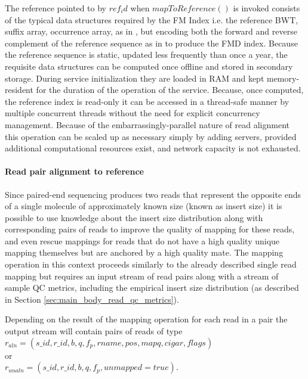 The reference pointed to by $ref_id$ when $mapToReference()$ is invoked consists of the typical data structures required by the FM Index i.e. the reference BWT, suffix array, occurrence array, as in \autocite{ferragina2000opportunistic}, but encoding both the forward and reverse complement of the reference sequence as in \autocite{Li2013} to produce the FMD index. Because the reference sequence is static, updated less frequently than once a year, the requisite data structures can be computed once offline and stored in secondary storage. During service initialization they are loaded in RAM and kept memory-resident for the duration of the operation of the service. Because, once computed, the reference index is read-only it can be accessed in a thread-safe manner by multiple concurrent threads without the need for explicit concurrency management. Because of the embarrassingly-parallel nature of read alignment this operation can be scaled up as necessary simply by adding servers, provided additional computational resources exist, and network capacity is not exhausted.

\paragraph{Read pair alignment to reference} 
Since paired-end sequencing produces two reads that represent the opposite ends of a single molecule of approximately known size (known as insert size) it is possible to use knowledge about the insert size distribution along with corresponding pairs of reads to improve the quality of mapping for these reads, and even rescue mappings for reads that do not have a high quality unique mapping themselves but are anchored by a high quality mate. The mapping operation in this context proceeds similarly to the already described single read mapping but requires an input stream of read pairs along with a stream of sample QC metrics, including the empirical insert size distribution (as described in Section \ref{sec:main_body_read_qc_metrics}).

Depending on the result of the mapping operation for each read in a pair the output stream will contain pairs of reads of type \\
$r_{aln} = (s\_id, r\_id, b, q, f_p, rname, pos, mapq, cigar, flags)$\\
or \\
$r_{unaln} = (s\_id, r\_id, b, q, f_p, unmapped=true)$. 

